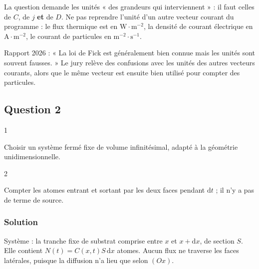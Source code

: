 \documentclass[11pt,a4paper]{article}
\begin{document}
\begin{piege}

La question demande les unités « des grandeurs qui interviennent » : il faut celles de \(C\), de \(j\) \textbf{et} de \(D\). Ne pas reprendre l'unité d'un autre vecteur courant du programme : le flux thermique est en \(\mathrm{W\cdot m^{-2}}\), la densité de courant électrique en \(\mathrm{A\cdot m^{-2}}\), le courant de particules en \(\mathrm{m^{-2}\cdot s^{-1}}\).

\end{piege}

\begin{jury}

Rapport 2026 : « La loi de Fick est généralement bien connue mais les unités sont souvent fausses. » Le jury relève des confusions avec les unités des autres vecteurs courants, alors que le même vecteur est ensuite bien utilisé pour compter des particules.

\end{jury}

\hypertarget{question-2}{%
\subsection{Question 2}\label{question-2}}

\begin{indication}{1}

Choisir un système fermé fixe de volume infinitésimal, adapté à la géométrie unidimensionnelle.

\end{indication}

\begin{indication}{2}

Compter les atomes entrant et sortant par les deux faces pendant \(\mathrm dt\) ; il n'y a pas de terme de source.

\end{indication}

\hypertarget{solution-1}{%
\subsubsection{Solution}\label{solution-1}}

Système : la tranche fixe de substrat comprise entre \(x\) et \(x+\mathrm dx\), de section \(S\). Elle contient \(N(t)=C(x,t)S\,\mathrm dx\) atomes. Aucun flux ne traverse les faces latérales, puisque la diffusion n'a lieu que selon \((Ox)\).
\end{document}
